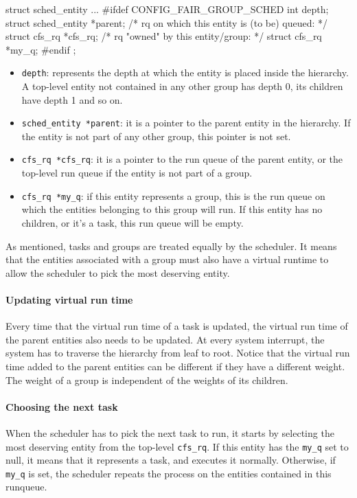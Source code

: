 \begin{code}
struct sched_entity {
...
#ifdef CONFIG_FAIR_GROUP_SCHED
	int				depth;
	struct sched_entity		*parent;
	/* rq on which this entity is (to be) queued: */
	struct cfs_rq			*cfs_rq;
	/* rq "owned" by this entity/group: */
	struct cfs_rq			*my_q;
#endif
};
\end{code}
\begin{itemize}
    \item \verb|depth|: represents the depth at which the entity is placed inside the hierarchy. A top-level entity not contained in any other group has depth 0, its children have depth 1 and so on.
    \item \verb|sched_entity *parent|: it is a pointer to the parent entity in the hierarchy. If the entity is not part of any other group, this pointer is not set.
    \item \verb|cfs_rq *cfs_rq|: it is a  pointer to the run queue of the parent entity, or the top-level run queue if the entity is not part of a group.
    \item \verb|cfs_rq *my_q|: if this entity represents a group, this is the run queue on which the entities belonging to this group will run. If this entity has no children, or it's a task, this run queue will be empty.
\end{itemize}

As mentioned, tasks and groups are treated equally by the scheduler. It means that the entities associated with a group must also have a virtual runtime to allow the scheduler to pick the most deserving entity.

\paragraph{Updating virtual run time}
Every time that the virtual run time of a task is updated, the virtual run time of the parent entities also needs to be updated. At every system interrupt, the system has to traverse the hierarchy from leaf to root. Notice that the virtual run time added to the parent entities can be different if they have a different weight. The weight of a group is independent of the weights of its children.

\paragraph{Choosing the next task}
When the scheduler has to pick the next task to run, it starts by selecting the most deserving entity from the top-level \verb|cfs_rq|. If this entity has the \verb|my_q| set to null, it means that it represents a task, and executes it normally. Otherwise, if \verb|my_q| is set, the scheduler repeats the process on the entities contained in this runqueue.

